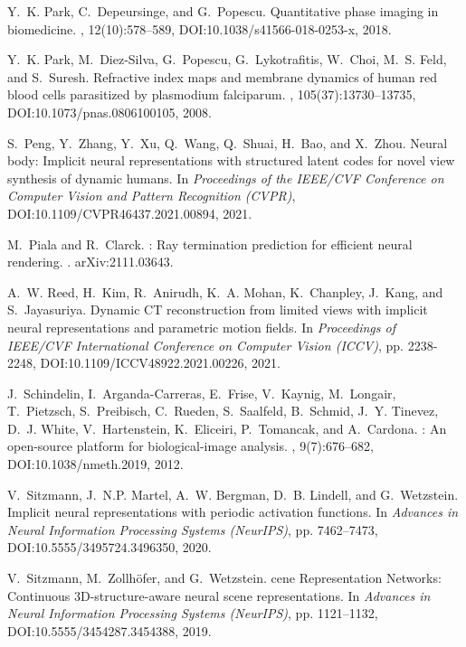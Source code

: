 \documentclass[11pt]{article}
\theoremstyle{plain} %
\begin{document}
\begin{thebibliography}{10}
Y.~K. Park, C.~Depeursinge, and G.~Popescu.
\newblock Quantitative phase imaging in biomedicine.
, 12(10):578--589,
\newblock DOI:10.1038/s41566-018-0253-x,
2018.

Y.~K. Park, M.~Diez-Silva, G.~Popescu, G.~Lykotrafitis, W.~Choi, M.~S. Feld, and S.~Suresh.
\newblock Refractive index maps and membrane dynamics of human red blood cells parasitized by plasmodium falciparum.
, 105(37):13730--13735,
\newblock DOI:10.1073/pnas.0806100105,
2008.

S.~Peng, Y.~Zhang, Y.~Xu, Q.~Wang, Q.~Shuai, H.~Bao, and X.~Zhou.
\newblock Neural body: Implicit neural representations with structured latent codes for novel view synthesis of dynamic humans.
\newblock In {\em Proceedings of the IEEE/CVF Conference on Computer Vision and Pattern Recognition (CVPR)},
\newblock DOI:10.1109/CVPR46437.2021.00894,
2021.

M.~Piala and R.~Clarck.
: {R}ay termination prediction for efficient neural rendering.
.
\newblock arXiv:2111.03643.

A.~W. Reed, H.~Kim, R.~Anirudh, K.~A. Mohan, K.~Chanpley, J.~Kang, and S.~Jayasuriya.
\newblock Dynamic {CT} reconstruction from limited views with implicit neural representations and parametric motion fields.
\newblock In {\em Proceedings of IEEE/CVF International Conference on Computer Vision (ICCV)}, pp. 2238-2248,
\newblock DOI:10.1109/ICCV48922.2021.00226,
2021.

J.~Schindelin, I.~Arganda-Carreras, E.~Frise, V.~Kaynig, M.~Longair, T.~Pietzsch, S.~Preibisch, C.~Rueden, S.~Saalfeld, B.~Schmid, J.~Y. Tinevez, D.~J. White, V.~Hartenstein, K.~Eliceiri, P.~Tomancak, and A.~Cardona.
: An open-source platform for biological-image analysis.
, 9(7):676--682,
\newblock DOI:10.1038/nmeth.2019,
2012.

V.~Sitzmann, J.~N.P. Martel, A.~W. Bergman, D.~B. Lindell, and G.~Wetzstein.
\newblock Implicit neural representations with periodic activation functions.
\newblock In {\em Advances in Neural Information Processing Systems (NeurIPS)}, pp. 7462–7473,
\newblock DOI:10.5555/3495724.3496350,
2020.

V.~Sitzmann, M.~Zollh{\"o}fer, and G.~Wetzstein.
cene {R}epresentation {N}etworks: Continuous {3D}-structure-aware neural scene representations.
\newblock In {\em Advances in Neural Information Processing Systems (NeurIPS)}, pp. 1121–1132,
\newblock DOI:10.5555/3454287.3454388,
2019.


\end{thebibliography}
\end{document}
